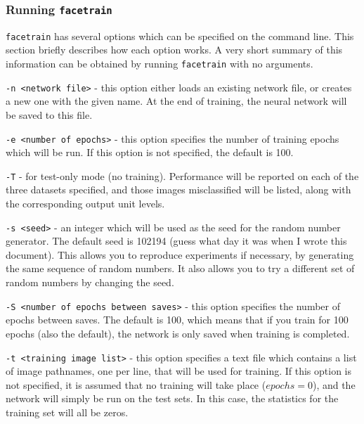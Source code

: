 \subsubsection{Running {\tt facetrain}}
\label{RUNFACE}

{\tt facetrain} has several options which can be specified on the
command line.  This section briefly describes how each option
works.  A very short summary of this information can be obtained
by running {\tt facetrain} with no arguments.

\begin{description}
\item {\tt -n <network file>} - this option either loads an existing
network file, or creates a new one with the given name.  At the end
of training, the neural network will be saved to this file.

\item {\tt -e <number of epochs>} - this option specifies the number
of training epochs which will be run.  If this option is not
specified, the default is 100.

\item {\tt -T} - for test-only mode (no training).  Performance
will be reported on each of the three datasets specified, and
those images misclassified will be listed, along with the corresponding
output unit levels.

\item {\tt -s <seed>} - an integer which will be used as the
seed for the random number generator.  The default seed is 102194
(guess what day it was when I wrote this document).  This allows you to
reproduce experiments if necessary, by generating the same sequence of
random numbers.  It also allows you to try a different set of random
numbers by changing the seed.

\item {\tt -S <number of epochs between saves>} - this option specifies
the number of epochs between saves.  The default is 100, which means
that if you train for 100 epochs (also the default), the network is
only saved when training is completed.

\item {\tt -t <training image list>} - this option specifies a text
file which contains a list of image pathnames, one per line, that
will be used for training.  If this option is not specified, it
is assumed that no training will take place ($epochs = 0$), and
the network will simply be run on the test sets.  In this case,
the statistics for the training set will all be zeros.


\end{description}
